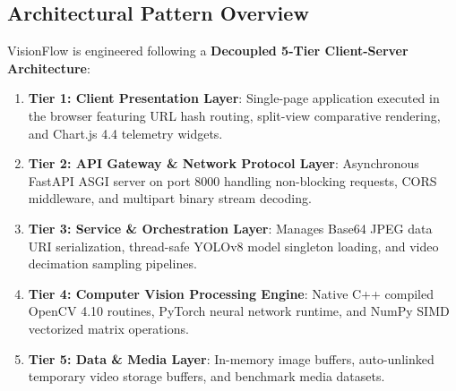 \documentclass[12pt,a4paper]{article}
\begin{document}
\subsection{Architectural Pattern Overview}
VisionFlow is engineered following a \textbf{Decoupled 5-Tier Client-Server Architecture}:
\begin{enumerate}
    \item \textbf{Tier 1: Client Presentation Layer}: Single-page application executed in the browser featuring URL hash routing, split-view comparative rendering, and Chart.js 4.4 telemetry widgets.
    \item \textbf{Tier 2: API Gateway \& Network Protocol Layer}: Asynchronous FastAPI ASGI server on port 8000 handling non-blocking requests, CORS middleware, and multipart binary stream decoding.
    \item \textbf{Tier 3: Service \& Orchestration Layer}: Manages Base64 JPEG data URI serialization, thread-safe YOLOv8 model singleton loading, and video decimation sampling pipelines.
    \item \textbf{Tier 4: Computer Vision Processing Engine}: Native C++ compiled OpenCV 4.10 routines, PyTorch neural network runtime, and NumPy SIMD vectorized matrix operations.
    \item \textbf{Tier 5: Data \& Media Layer}: In-memory image buffers, auto-unlinked temporary video storage buffers, and benchmark media datasets.
\end{enumerate}
\end{document}
